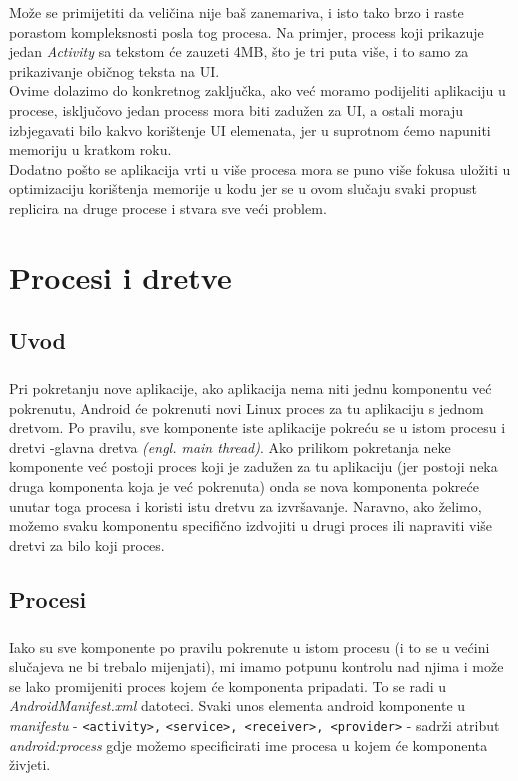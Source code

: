 \documentclass[times, utf8, zavrsni]{fer}
\begin{document}
Može se primijetiti da veličina nije baš zanemariva, i isto tako brzo i raste porastom kompleksnosti posla tog procesa. Na primjer, process koji prikazuje jedan \textit{Activity} sa tekstom će zauzeti 4MB, što je tri puta više, i to samo za prikazivanje običnog teksta na UI.\\

Ovime dolazimo do konkretnog zaključka, ako već moramo podijeliti aplikaciju u procese, isključovo jedan process mora biti zadužen za UI, a ostali moraju izbjegavati bilo kakvo korištenje UI elemenata, jer u suprotnom ćemo napuniti memoriju u kratkom roku.\\

Dodatno pošto se aplikacija vrti u više procesa mora se puno više fokusa uložiti u optimizaciju korištenja memorije u kodu jer se u ovom slučaju svaki propust replicira na druge procese i stvara sve veći problem.

\pagebreak
\chapter{Procesi i dretve}
\section{Uvod}
\paragraph{}
Pri pokretanju nove aplikacije, ako aplikacija nema niti jednu komponentu već pokrenutu, Android će pokrenuti novi Linux proces za tu aplikaciju s jednom dretvom. Po pravilu, sve komponente iste aplikacije pokreću se u istom procesu i dretvi -glavna dretva \textit{(engl. main thread)}. Ako prilikom pokretanja neke komponente već postoji proces koji je zadužen za tu aplikaciju (jer postoji neka druga komponenta koja je već pokrenuta) onda se nova komponenta pokreće unutar toga procesa i koristi istu dretvu za izvršavanje. Naravno, ako želimo, možemo svaku komponentu specifično izdvojiti u drugi proces ili napraviti više dretvi za bilo koji proces.

\section{Procesi}
\paragraph{}
Iako su sve komponente po pravilu pokrenute u istom procesu (i to se u većini slučajeva ne bi trebalo mijenjati), mi imamo potpunu kontrolu nad njima i može se lako promijeniti proces kojem će komponenta pripadati. To se radi u \textit{AndroidManifest.xml} datoteci. Svaki unos elementa android komponente u \textit{manifestu} - \verb|<activity>,| \verb|<service>, <receiver>, <provider>| - sadrži atribut \textit{android:process} gdje možemo specificirati ime procesa u kojem će komponenta živjeti.
\end{document}

